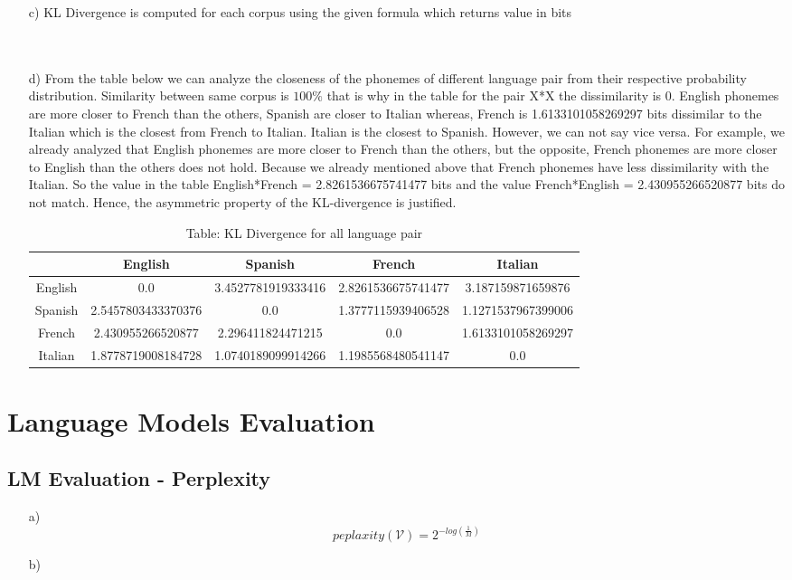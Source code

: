 \documentclass{article}
\begin{document}
\begin{itemize}
    \item[c)]
    KL Divergence is computed for each corpus using the given formula which returns value in bits 
    \\\\\\
    \item[d)]  
        From the table below we can analyze the closeness of the phonemes of different language pair from their respective probability distribution. Similarity between same corpus is $100\%$ that is why in the table for the pair X*X the dissimilarity is 0. English phonemes are more closer to French than the others, Spanish are closer to Italian whereas, French is 1.6133101058269297 bits dissimilar to the Italian which is the closest from French to Italian. Italian is the closest to Spanish. However, we can not say vice versa. For example, we already analyzed that English phonemes are more closer to French than the others, but the opposite, French phonemes are more closer to English than the others does not hold. Because we already mentioned above that French phonemes have less dissimilarity with the Italian. So the value in the table English*French = 2.8261536675741477 bits and the value French*English = 2.430955266520877 bits do not match. Hence, the asymmetric property of the KL-divergence is justified.
        \begin{table}[ht]
            \centering
            \begin{tabular}{|c| c| c| c| c|}
                \hline 
                & English & Spanish & French & Italian \\ [0.5ex]
                \hline
                English & 0.0 & 3.4527781919333416 & 2.8261536675741477 & 3.187159871659876 \\
                \hline
                Spanish & 2.5457803433370376 & 0.0 & 1.3777115939406528 & 1.1271537967399006 \\
                \hline
                French & 2.430955266520877 & 2.296411824471215 & 0.0 & 1.6133101058269297 \\
                \hline
                Italian & 1.8778719008184728 &  1.0740189099914266 &  1.1985568480541147 &  0.0 \\ [1ex]
                \hline
            \end{tabular}
            \caption{\hspace*{4.0cm}Table: KL Divergence for all language pair}
        \end{table}
        \end{itemize}


\section{Language Models Evaluation}
\subsection{LM Evaluation - Perplexity}
\begin{itemize}
	\item[a)]
		$$peplaxity(\mathcal{V}) = 2^{-log(\frac{1}{M})}$$
	\item[b)]
		
\end{itemize}
\end{document}
